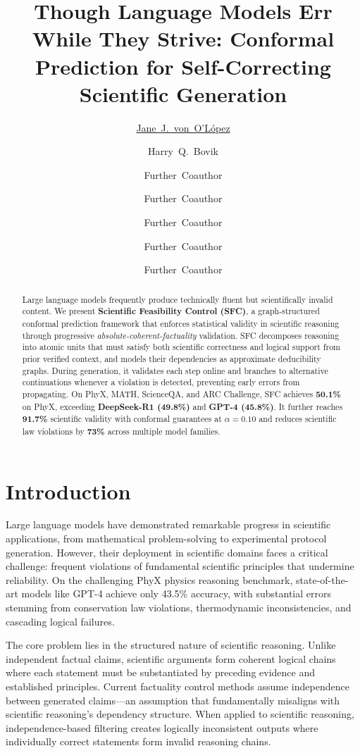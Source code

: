 \documentclass{uai2026} %
\title{Though Language Models Err While They Strive: Conformal Prediction for Self-Correcting Scientific Generation}
\author[1]{\href{mailto:<jj@example.edu>?Subject=Your UAI 2026 paper}{Jane~J.~von~O'L\'opez}{}}
\author[1]{Harry~Q.~Bovik}
\author[1,2]{Further~Coauthor}
\author[3]{Further~Coauthor}
\author[1]{Further~Coauthor}
\author[3]{Further~Coauthor}
\author[3,1]{Further~Coauthor}
\affil[1]{%
    Computer Science Dept.\\
    Cranberry University\\
    Pittsburgh, Pennsylvania, USA
}
\affil[2]{%
    Second Affiliation\\
    Address\\
    …
}
\affil[3]{%
    Another Affiliation\\
    Address\\
    …
  }
\theoremstyle{remark}
\theoremstyle{plain}
\theoremstyle{definition}
\begin{document}
\maketitle

\begin{abstract}
Large language models frequently produce technically fluent but scientifically invalid content. We present \textbf{Scientific Feasibility Control (SFC)}, a graph-structured conformal prediction framework that enforces statistical validity in scientific reasoning through progressive \textit{absolute-coherent-factuality} validation. SFC decomposes reasoning into atomic units that must satisfy both scientific correctness and logical support from prior verified context, and models their dependencies as approximate deducibility graphs. During generation, it validates each step online and branches to alternative continuations whenever a violation is detected, preventing early errors from propagating. On PhyX, MATH, ScienceQA, and ARC Challenge, SFC achieves \textbf{50.1\%} on PhyX, exceeding \textbf{DeepSeek-R1 (49.8\%)} and \textbf{GPT-4 (45.8\%)}. It further reaches \textbf{91.7\%} scientific validity with conformal guarantees at $\alpha = 0.10$ and reduces scientific law violations by \textbf{73\%} across multiple model families.
\end{abstract}

\section{Introduction}

Large language models have demonstrated remarkable progress in scientific applications, from mathematical problem-solving to experimental protocol generation. However, their deployment in scientific domains faces a critical challenge: frequent violations of fundamental scientific principles that undermine reliability. On the challenging PhyX physics reasoning benchmark, state-of-the-art models like GPT-4 achieve only 43.5\% accuracy, with substantial errors stemming from conservation law violations, thermodynamic inconsistencies, and cascading logical failures.

The core problem lies in the structured nature of scientific reasoning. Unlike independent factual claims, scientific arguments form coherent logical chains where each statement must be substantiated by preceding evidence and established principles. Current factuality control methods assume independence between generated claims—an assumption that fundamentally misaligns with scientific reasoning's dependency structure. When applied to scientific reasoning, independence-based filtering creates logically inconsistent outputs where individually correct statements form invalid reasoning chains.
\end{document}

